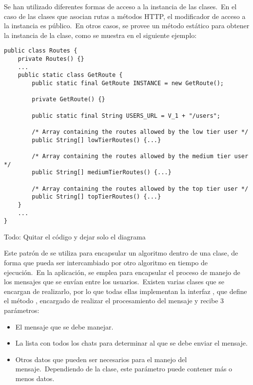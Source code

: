 Se han utilizado diferentes formas de acceso a la instancia de las clases.\ En el caso de las clases que asocian rutas a
métodos HTTP, el modificador de acceso a la instancia es público.\ En otros casos, se provee un método estático para
obtener la instancia de la clase, como se muestra en el siguiente ejemplo:

\begin{codeBlock}
	\begin{verbatim}
public class Routes {
	private Routes() {}
	...
	public static class GetRoute {
		public static final GetRoute INSTANCE = new GetRoute();

		private GetRoute() {}

		public static final String USERS_URL = V_1 + "/users";

		/* Array containing the routes allowed by the low tier user */
		public String[] lowTierRoutes() {...}

		/* Array containing the routes allowed by the medium tier user */
		public String[] mediumTierRoutes() {...}

		/* Array containing the routes allowed by the top tier user */
		public String[] topTierRoutes() {...}
	}
	...
}
	\end{verbatim}

	\caption{Rutas utilizadas para simplificar el proceso de autorización de los usuarios.}
\end{codeBlock}

{\Huge Todo: Quitar el código y dejar solo el diagrama}

Este patrón de  se utiliza para encapsular un algoritmo dentro de una clase, de forma que
pueda ser intercambiado por otro algoritmo en tiempo de ejecución.\ En la aplicación, se emplea para encapsular el
proceso de manejo de los mensajes que se envían entre los usuarios.\ Existen varias clases que se encargan de
realizarlo, por lo que todas ellas implementan la interfaz , que define el método
, encargado de realizar el procesamiento del mensaje y recibe 3 parámetros:

\begin{itemize}
	\item El mensaje que se debe manejar.
	\item La lista con todos los chats para determinar al que se debe enviar el mensaje.
	\item Otros datos que pueden ser necesarios para el manejo del mensaje.\ Dependiendo de la clase, este parámetro
	puede contener más o menos datos.
\end{itemize}
\label{itm:parametershandlestrategy}

